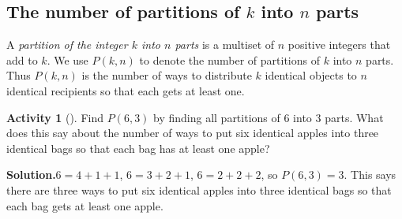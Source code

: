 \documentclass[10pt,]{book}
\theoremstyle{plain}
\theoremstyle{definition}
\newtheorem{activity}[project]{Activity}
\numberwithin{equation}{chapter}
\begin{document}
\subsection[{The number of partitions of \(k\) into \(n\) parts}]{The number of partitions of \(k\) into \(n\) parts}\label{subsection-13}
A \emph{partition of the integer \(k\) into \(n\) parts} is a multiset of \(n\) positive integers that add to \(k\). We use \(P(k,n)\) to denote the number of partitions of \(k\) into \(n\) parts. Thus \(P(k,n)\) is the number of ways to distribute \(k\) identical objects to \(n\) identical recipients so that each gets at least one.%
\begin{activity}[]\label{activity-49}
Find \(P(6,3)\) by finding all partitions of 6 into 3 parts. What does this say about the number of ways to put six identical apples into three identical bags so that each bag has at least one apple?%
\par\medskip\noindent%
\textbf{Solution.}\quad \(6=4+1+1\), \(6=3+2+1\), \(6=2+2+2\), so \(P(6,3)=3\). This says there are three ways to put six identical apples into three identical bags so that each bag gets at least one apple.%
\end{activity}
\typeout{************************************************}
\typeout{************************************************}
\end{document}
